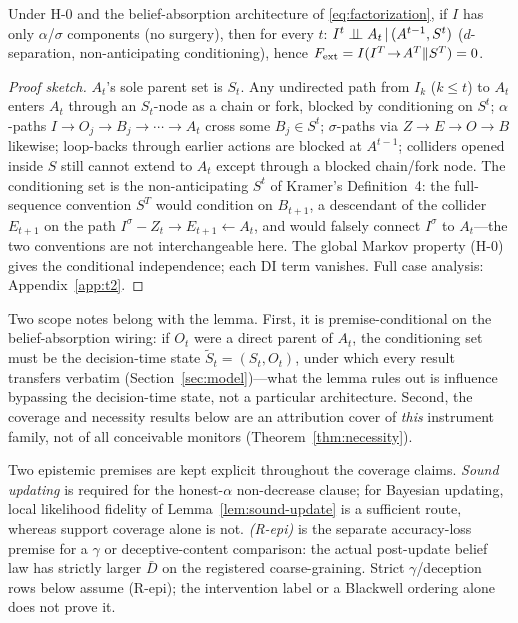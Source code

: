 \begin{lemma}\label{lem:mediation}
Under H-0 and the belief-absorption architecture of \eqref{eq:factorization},
if $I$ has only $\alpha$/$\sigma$ components (no surgery), then for every $t$:
$I^t \perp\!\!\!\perp A_t \,|\, (A^{t-1},S^t)$ ($d$-separation, non-anticipating
conditioning), hence $F_{\mathrm{ext}}=I(I^T\!\to\!A^T\|S^T)=0$.
\end{lemma}
\begin{proof}[Proof sketch]
$A_t$'s sole parent set is $S_t$. Any undirected path from $I_k$ ($k\le t$) to
$A_t$ enters $A_t$ through an $S_t$-node as a chain or fork, blocked by
conditioning on $S^t$; $\alpha$-paths $I\to O_j\to B_j\to\cdots\to A_t$ cross
some $B_j\in S^t$; $\sigma$-paths via $Z\to E\to O\to B$ likewise; loop-backs
through earlier actions are blocked at $A^{t-1}$; colliders opened inside $S$
still cannot extend to $A_t$ except through a blocked chain/fork node. The
conditioning set is the non-anticipating $S^t$ of Kramer's Definition~4:
the full-sequence convention $S^T$ would condition on $B_{t+1}$, a descendant
of the collider $E_{t+1}$ on the path $I^\sigma\!-\!Z_t\!\to\!E_{t+1}
\!\leftarrow\!A_t$, and would falsely connect $I^\sigma$ to $A_t$---the two
conventions are not interchangeable here. The global Markov property (H-0)
gives the conditional independence; each DI term vanishes. Full case analysis:
Appendix~\ref{app:t2}.
\end{proof}

Two scope notes belong with the lemma. First, it is premise-conditional on
the belief-absorption wiring: if $O_t$ were a direct parent of $A_t$, the
conditioning set must be the decision-time state
$\tilde S_t=(S_t,O_t)$, under which every result transfers verbatim
(Section~\ref{sec:model})---what the lemma rules out is influence bypassing
the decision-time state, not a particular architecture. Second, the coverage
and necessity results below are an attribution cover of \emph{this}
instrument family, not of all conceivable monitors
(Theorem~\ref{thm:necessity}).

Two epistemic premises are kept explicit throughout the coverage claims.
\emph{Sound updating} is required for the honest-$\alpha$ non-decrease
clause; for Bayesian updating, local likelihood fidelity of
Lemma~\ref{lem:sound-update} is a sufficient route, whereas support coverage
alone is not. \emph{(R-epi)} is the separate accuracy-loss premise for a
$\gamma$ or deceptive-content comparison: the actual post-update belief law
has strictly larger $\bar D$ on the registered coarse-graining. Strict
$\gamma$/deception rows below assume (R-epi); the intervention label or a
Blackwell ordering alone does not prove it.

